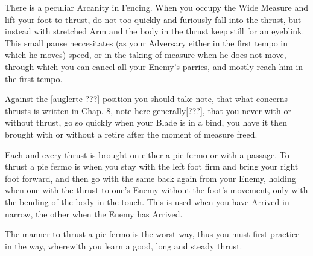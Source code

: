 There is a peculiar Arcanity in Fencing. When you occupy the Wide
Measure and lift your foot to thrust, do not too quickly and furiously
fall into the thrust, but instead with stretched Arm and the body in
the thrust keep still for an eyeblink. This small pause neccesitates (as your
Adversary either in the first tempo in which he moves) speed, or in
the taking of measure when he does not move, through which you can
cancel all your Enemy's parries, and mostly reach him in the first tempo.


Against the [auglerte ???] position you should take note, that what
concerns thrusts is written in Chap. 8, note here
generally[???], that you
never with or without thrust, go so quickly when your Blade is in a
bind, you have it then brought with or without a retire after the
moment of measure freed.



Each and every thrust is brought on either a pie fermo or with a
passage. To thrust a pie fermo is when you stay with the left foot
firm and bring your right foot forward, and then go with the same back
again from your Enemy, holding when one with the thrust to one's Enemy
without the foot's movement, only with the bending of the body in the
touch. This is used when you have Arrived in narrow, the other when
the Enemy has Arrived.


The manner to thrust a pie fermo is the worst way, thus you must
first practice in the way, wherewith you learn a good,
long and steady thrust.
